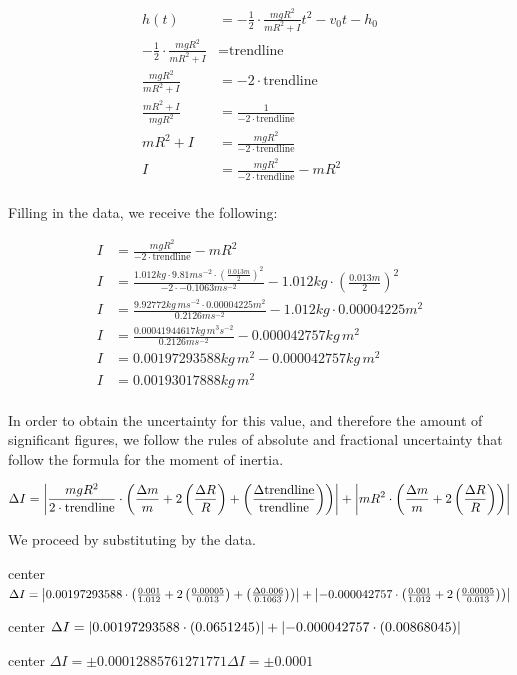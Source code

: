 \documentclass{article}
\begin{document}
\begin{align*}
h(t) &=  -\frac{1}{2} \cdot \frac{mgR^2}{mR^2+I} t^2 - v_0 t - h_0 \\
-\frac{1}{2} \cdot \frac{mgR^2}{mR^2+I} &= \text{trendline}\\
\frac{mgR^2}{mR^2+I} &= -2\cdot\text{trendline}\\
\frac{mR^2+I}{mgR^2} &= \frac{1}{-2\cdot\text{trendline}}\\
mR^2+I &= \frac{mgR^2}{-2\cdot\text{trendline}}\\
I &= \frac{mgR^2}{-2\cdot\text{trendline}} -mR^2 \\
\end{align*}

Filling in the data, we receive the following:

\begin{align*}
I &= \frac{mgR^2}{-2\cdot\text{trendline}} -mR^2 \\
I &= \frac{1.012kg \cdot 9.81ms^{-2} \cdot (\frac{0.013m}{2})^2}{-2\cdot-0.1063ms^{-2}} -1.012kg \cdot (\frac{0.013m}{2})^2 \\
I &= \frac{9.92772kg\,ms^{-2} \cdot 0.00004225m^2}{0.2126ms^{-2}} -1.012kg \cdot 0.00004225m^2 \\
I &= \frac{0.00041944617kg\,m^3s^{-2}}{0.2126ms^{-2}} -0.000042757kg\,m^2 \\
I &= 0.00197293588kg\,m^2 -0.000042757kg\,m^2 \\
I &= 0.00193017888kg\,m^2 \\
\end{align*}

In order to obtain the uncertainty for this value, and therefore the amount of significant figures, we follow the rules of absolute and fractional uncertainty that follow the formula for the moment of inertia.

\begin{align*}
\Delta I=\abs{\frac{m g R^2}{2 \cdot \text{trendline}}\cdot\left(\frac{\Delta m}{m}+2\left(\frac{\Delta R}{R}\right)+\left(\frac{\Delta \text{trendline}}{\text{trendline}}\right)\right)}+\abs{ m R^2\cdot\left(\frac{\Delta m}{m}+2\left(\frac{\Delta R}{R}\right)\right)}
\end{align*}

We proceed by substituting by the data.

\vspace{0.5cm}
\begin{adjustbox}{center}
$
\Delta I=\abs{0.00197293588\cdot\left(\frac{0.001}{1.012}+2\left(\frac{0.00005}{0.013}\right)+\left(\frac{\Delta 0.006}{0.1063}\right)\right)}+ \abs{-0.000042757\cdot\left(\frac{0.001}{1.012}+2\left(\frac{0.00005}{0.013}\right)\right)}
$
\end{adjustbox}
\begin{adjustbox}{center}
$
\Delta I=\abs{0.00197293588\cdot\left(0.0651245\right)}+ \abs{-0.000042757\cdot\left(0.00868045\right)}
$
\end{adjustbox}
\begin{adjustbox}{center}
$
\Delta I=\pm0.00012885761271771
\Delta I=\pm0.0001
$
\end{adjustbox}
\vspace{-0.3cm}
\end{document}
